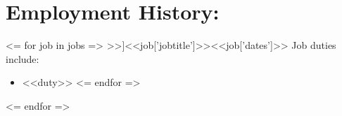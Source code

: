 \documentclass{resume}
\begin{document}
\begin{comment}

New section, trying it out
Currently canning this section but THAT'S OKAY
\section*{\underline{\textit{Projects:}}}
\large\textit{Super Four-Bar Explorer \hfill December 2008}\normalsize
\small\begin{itemize}
\item A program written in python that uses a Gauss-Newton unconstrained optimization algorithm to fit the path traced by a four bar linkage to a given set of points
\item Accompanied by a spreadsheet that illustrates four-bar linkage traced paths
\end{itemize}\normalsize\medskip

Another new section, recommended by Career Services. At worst, I have the
wording for it, amirite?
\section*{\underline{\textit{Service:}}}
\tiny\begin{enumerate}
\item Administered the web site and Facebook page for ASME's UAF student chapter \hfill 2009--2010
\item Volunteered at the UAF College of Engineering and Mines' Engineer's Week Open House \hfill February 2010
\end{enumerate}\normalsize

\large\textit{Society of Automotive Engineers, UAF
Chapter\hfill2009}\normalsize\\
\textit{Treasurer}
\end{comment}

\section{Employment History:}

<= for job in jobs =>
    \affiliation[<<job['employername']>>]{<<job['jobtitle']>>}{<<job['dates']>>}\normalsize
    Job duties include:
    \small\begin{itemize}
    <= for duty in job['duties'] =>
        \item <<duty>>
    <= endfor =>
    \end{itemize}\normalsize
<= endfor =>
\end{document}
